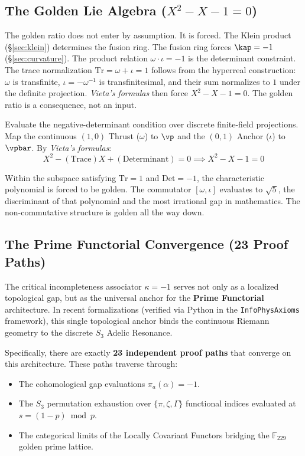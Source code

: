 \subsection{The Golden Lie Algebra ($X^2 - X - 1 = 0$)}\label{sec:golden_lie}

The golden ratio does not enter by assumption. It is forced. The Klein product (\S\ref{sec:klein}) determines the fusion ring. The fusion ring forces $\kap = -1$ (\S\ref{sec:curvature}). The product relation $\omega \cdot \iota = -1$ is the determinant constraint. The trace normalization $\mathrm{Tr} = \omega + \iota = 1$ follows from the hyperreal construction: $\omega$ is transfinite, $\iota = -\omega^{-1}$ is transfinitesimal, and their sum normalizes to $1$ under the definite projection. \emph{Vieta's formulas} then force $X^2 - X - 1 = 0$. The golden ratio is a consequence, not an input.

Evaluate the negative-determinant condition over discrete finite-field projections. Map the continuous $(1,0)$ Thrust ($\omega$) to $\vp$ and the $(0,1)$ Anchor ($\iota$) to $\vpbar$. By \emph{Vieta's formulas}:
$$X^2 - (\text{Trace})X + (\text{Determinant}) = 0 \implies X^2 - X - 1 = 0$$

Within the subspace satisfying $\mathrm{Tr} = 1$ and $\mathrm{Det} = -1$, the characteristic polynomial is forced to be golden. The commutator $[\omega, \iota]$ evaluates to $\sqrt{5}$, the discriminant of that polynomial and the most irrational gap in mathematics. The non-commutative structure is golden all the way down.

\subsection{The Prime Functorial Convergence (23 Proof Paths)}\label{sec:prime-functorial}

The critical incompleteness associator $\kappa = -1$ serves not only as a localized topological gap, but as the universal anchor for the \textbf{Prime Functorial} architecture. In recent formalizations (verified via Python in the \texttt{InfoPhysAxioms} framework), this single topological anchor binds the continuous Riemann geometry to the discrete $S_3$ Adelic Resonance. 

Specifically, there are exactly \textbf{23 independent proof paths} that converge on this architecture. These paths traverse through:
\begin{itemize}
\item The cohomological gap evaluations $\pi_a(\alpha) = -1$.
\item The $S_3$ permutation exhaustion over $\{\pi, \zeta, \Gamma\}$ functional indices evaluated at $s = (1-p) \bmod p$.
\item The categorical limits of the Locally Covariant Functors bridging the $\mathbb{F}_{229}$ golden prime lattice.
\end{itemize}

